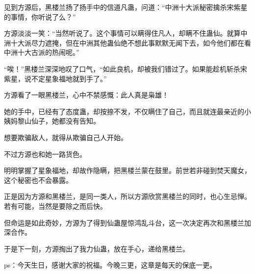\begin{this_body}
见到方源后，黑楼兰扬了扬手中的信道凡蛊，问道：“中洲十大派秘密擒杀宋紫星的事情，你听说了么？”

方源淡淡一笑：“当然听说了。这个事情可以瞒得住凡人，却瞒不住蛊仙。就算中洲十大派尽力遮掩，但在中洲其他蛊仙绝不想此事默默无闻下去，如今他们都在看中洲十大古派的热闹呢。”

“唉！”黑楼兰深深地叹了口气，“如此良机，却被我们错过了。如果能趁机斩杀宋紫星，说不定星象福地就到手了。”

方源看了一眼黑楼兰，心中不禁感慨：此人真是枭雄！

她的手中，已经有了态度蛊，却按捺不发，不仅瞒住了自己，而且就连最亲近的小姨妈黎山仙子，她都没有告知。

想要欺骗敌人，就得从欺骗自己人开始。

不过方源也和她一路货色。

明明掌握了星象福地，却故作隐瞒，把黑楼兰蒙在鼓里。前世若非碰到焚天魔女，这个秘密也不会暴露。

正是因为方源和黑楼兰，是同一类人，所以方源欣赏黑楼兰的同时，也心生忌惮。若有可能，当然是要除之而后快。

但命运是如此奇妙，方源为了得到仙蛊屋惊鸿乱斗台，这一次决定再次和黑楼兰加深合作。

于是下一刻，方源掏出了我力仙蛊，放在手心，递给黑楼兰。

ps：今天生日，感谢大家的祝福。今晚三更，这章是每天的保底一更。

\end{this_body}

